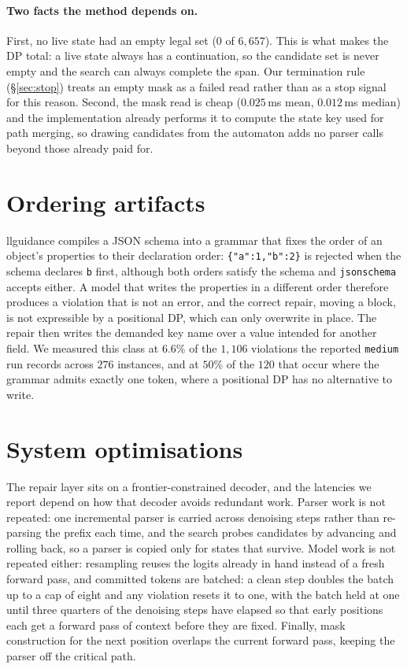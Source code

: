 \paragraph{Two facts the method depends on.}
First, no live state had an empty legal set ($0$ of $6{,}657$). This is what
makes the DP total: a live state always has a continuation, so the candidate set
is never empty and the search can always complete the span. Our termination rule
(\S\ref{sec:stop}) treats an empty mask as a failed read rather than as a stop
signal for this reason. Second, the mask read is cheap ($0.025$\,ms mean,
$0.012$\,ms median) and the implementation already performs it to compute the
state key used for path merging, so drawing candidates from the automaton adds
no parser calls beyond those already paid for.



\section{Ordering artifacts}
\label{app:ordering}

llguidance compiles a JSON schema into a grammar that fixes the order of an
object's properties to their declaration order: \texttt{\{"a":1,"b":2\}} is
rejected when the schema declares \texttt{b} first, although both orders satisfy
the schema and \texttt{jsonschema} accepts either. A model that writes the
properties in a different order therefore produces a violation that is not an
error, and the correct repair, moving a block, is not expressible by a
positional DP, which can only overwrite in place. The repair then writes the
demanded key name over a value intended for another field. We measured this class
at $6.6\%$ of the $1{,}106$ violations the reported \texttt{medium} run records
across $276$ instances, and at $50\%$ of the $120$ that occur where the grammar
admits exactly one token, where a positional DP has no alternative to write.


\section{System optimisations}
\label{app:sysopt}

The repair layer sits on a frontier-constrained decoder, and the latencies we
report depend on how that decoder avoids redundant work. Parser work is not
repeated: one incremental parser is
carried across denoising steps rather than re-parsing the prefix each time, and
the search probes candidates by advancing and rolling back, so a parser is
copied only for states that survive. Model work is not repeated either:
resampling reuses the logits already in hand instead of a fresh forward pass,
and committed tokens are batched: a clean step doubles the batch up to a cap of
eight and any violation resets it to one, with the batch held at one until three
quarters of the denoising steps have elapsed so that early positions each get a
forward pass of context before they are fixed. Finally, mask construction
for the next position overlaps the current forward pass, keeping the parser off
the critical path.

